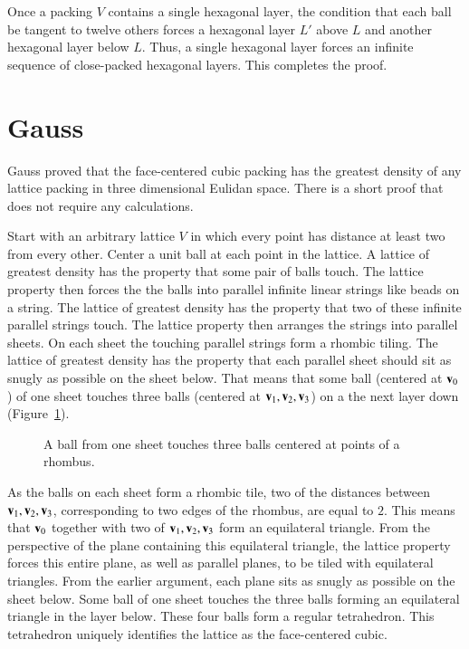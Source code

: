 Once a packing $V$ contains a single hexagonal layer, the condition
that each ball be tangent to twelve others forces a hexagonal layer
$L'$ above $L$ and another hexagonal layer below $L$.  Thus, a single
hexagonal layer forces an infinite sequence of close-packed hexagonal
layers.  This completes the proof.



\section{Gauss}

Gauss proved that the face-centered cubic packing has the greatest density
of any lattice packing in three dimensional Eulidan space.  There is a
short proof that does not require any calculations.

Start with an arbitrary lattice $V$ in which every point has distance
at least two from every other.  Center a unit ball at each point in
the lattice.  A lattice of greatest density has the property that some
pair of balls touch.  The lattice property then forces the the balls
into parallel infinite linear strings like beads on a string.  The
lattice of greatest density has the property that two of these
infinite parallel strings touch.  The lattice property then arranges
the strings into parallel sheets.  On each sheet the touching parallel
strings form a rhombic tiling.  The lattice of greatest density has
the property that each parallel sheet should sit as snugly as possible
on the sheet below.  That means that some ball (centered at ${\mathbf v}_0$) of
one sheet touches three balls (centered at ${\mathbf v}_1,{\mathbf v}_2,{\mathbf v}_3$) on a the
next layer down (Figure~\ref{fig:rhombus}).

\begin{figure}[htb]
  \centering
  \caption{A ball from one sheet touches three balls centered at points of a rhombus.}
  \label{fig:rhombus}
\end{figure}

As the balls on each sheet form a rhombic tile, two of the distances
between ${\mathbf v}_1,{\mathbf v}_2,{\mathbf v}_3$, corresponding to two edges of the rhombus, are
equal to $2$.  This means that ${\mathbf v}_0$ together with two of
${\mathbf v}_1,{\mathbf v}_2,{\mathbf v}_3$ form an equilateral triangle.  From the perspective of
the plane containing this equilateral triangle, the lattice property
forces this entire plane, as well as parallel planes, to be tiled with
equilateral triangles.  From the earlier argument, each plane sits as
snugly as possible on the sheet below.  Some ball of one sheet touches
the three balls forming an equilateral triangle in the layer below.
These four balls form a regular tetrahedron.  This tetrahedron
uniquely identifies the lattice as the face-centered cubic.






